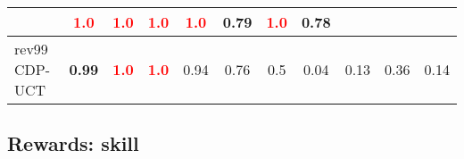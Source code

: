 \documentclass{article}
\begin{document}
\begin{tabular}{|l|r@{$\pm$}rr@{$\pm$}rr@{$\pm$}rr@{$\pm$}rr@{$\pm$}rr@{$\pm$}rr@{$\pm$}rr@{$\pm$}rr@{$\pm$}rr@{$\pm$}r|}
& \multicolumn{2}{c}{\textbf{\textcolor{red}{1.0}}}
& \multicolumn{2}{c}{\textbf{\textcolor{red}{1.0}}}
& \multicolumn{2}{c}{\textbf{\textcolor{red}{1.0}}}
& \multicolumn{2}{c}{\textbf{\textcolor{red}{1.0}}}
& \multicolumn{2}{c}{0.79}
& \multicolumn{2}{c}{\textbf{\textcolor{red}{1.0}}}
& \multicolumn{2}{c|}{0.78}
\\
\hline
rev99 CDP-UCT
& \multicolumn{2}{c}{\textbf{0.99}}
& \multicolumn{2}{c}{\textbf{\textcolor{red}{1.0}}}
& \multicolumn{2}{c}{\textbf{\textcolor{red}{1.0}}}
& \multicolumn{2}{c}{0.94}
& \multicolumn{2}{c}{0.76}
& \multicolumn{2}{c}{0.5}
& \multicolumn{2}{c}{0.04}
& \multicolumn{2}{c}{0.13}
& \multicolumn{2}{c}{0.36}
& \multicolumn{2}{c|}{0.14}
\\
\hline
\end{tabular}%

\bigskip

\subsection*{Rewards: skill}
\end{document}
